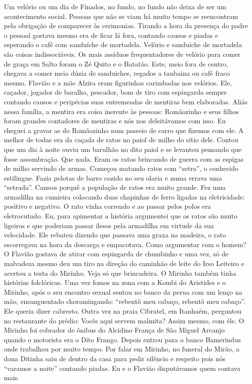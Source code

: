 \documentclass[12pt,brazil,]{book}
\begin{document}
Um velório ou um dia de Finados, no fundo, no fundo não deixa de ser um
acontecimento social. Pessoas que não se viam há muito tempo se
reencontram pela obrigação de comparecer às cerimonias. Tirando a hora
da presença do padre o pessoal gostava mesmo era de ficar lá fora,
contando causos e piadas e esperando o café com sanduíche de mortadela.
Velório e sanduiche de mortadela são coisas indissociáveis. Os mais
assíduos frequentadores de velório para comer de graça em Salto foram o
Zé Quito e o Batatão. Este, meio fora de centro, chegava a comer meia
dúzia de sanduiches, regados a taubaina ou café fraco mesmo. Flavião e a
mãe Alzira eram figurinhas carimbadas nos velórios. Ele, caçador,
jogador de baralho, pescador, bom de tiro com espingarda sempre contando
causos e peripécias suas entremeadas de mentiras bem elaboradas. Aliás
nessa família, a mentira era coisa inerente às pessoas: Romãozinho e
seus filhos foram grandes contadores de mentiras e nós nos deleitávamos
com isso. Eu cheguei a gravar as do Romãozinho num passeio de carro que
fizemos com ele. A melhor de todas era da caçada de ratos no paiol de
milho do sítio dele. Contou que um dia à noite ouviu um barulhão no dito
paiol e se levantou pensando que fosse assombração. Que nada. Eram os
ratos brincando de guerra com as espigas de milho servindo de armas.
Começou matando ratos com ``setra'', o conhecido estilingue. Fazia
pelotas de barro cozido no seu olaria e numa errava uma ``setrada''.
Cansou porquê a população de ratos era muito grande. Fez uma armadilha
na cumieira colocando duas chapinhas de ferro ligadas na eletricidade:
positivo e negativo. O rato vinha correndo e ao passar pelos polos era
eletrocutado. Eu, para apimentar a história argumentei que os ratos são
muito ligeiros e que poderiam passar ilesos pela armadilha em virtude da
sua velocidade. Ele rebateu dizendo que passava uma graxa na madeira, o
rato escorregava na hora da descarga e empacotava. Como argumentar com o
homem? O Flavião gostava de atirar com espingarda de chumbinho e uma
vez, só de malvadeza mesmo deu um tiro na direção do caminhão de leite
do Irso Leiteiro e acertou a testa do Mirinho. Veja só que brincadeira.
O Mirinho também tinha histórias folclóricas. Uma vez fomos na zona com
a Kombi do Aristides e o Mirinho, após o seu encontro sexual sentou no
banco da perua com um lenço na mão, ensanguentado choramingando:
``rebentô meu cabaço, rebentô meu cabaço''. Ele queria dizer cabresto.
Outra vez na praia Cibratel, em Itanhaém, perguntou no restaurante do
prédio: Vocês aqui servem malmita? Assim mesmo, com éle. O Mirinho foi
cobrador de ônibus do Alcidino França de São Miguel Arcanjo quando o
motorista era o Dito Frango. Depois entrou para o banco Bamerindus onde
trabalhou por muito tempo. Por falar em Mirinho, no funeral do Mirão, a
dona Ditinha saiu de dentro da casa para pedir silêncio e respeito pois
nós ``varamos a noite'' contando piadas. Eu e o Flavião disputávamos
quem contava mais.
\end{document}
